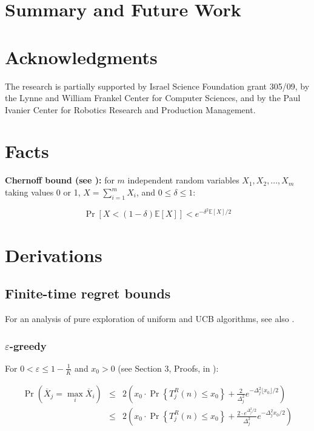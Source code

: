 \documentclass{article}
\newcommand {\IE} {\ensuremath {\mathbb{E}}}
\begin{document}
\section{Summary and Future Work}

\section*{Acknowledgments}

The research is partially supported by Israel
Science Foundation grant 305/09, by the Lynne and William Frankel
Center for Computer Sciences, and by the Paul Ivanier Center for
Robotics Research and Production Management.




\pagebreak

\appendix

\section{Facts}

{\bf Chernoff bound (see \cite{Hagerup.chernoff}):} for $m$ independent random variables $X_1, X_2, ..., X_m$
taking values 0 or 1, $X=\sum_{i=1}^m X_i$, and $0\le\delta\le 1$:

\begin{equation}
\label{eq:chernoff-bound}
\Pr[X < (1-\delta)\IE[X]] < e^{-\delta^2\IE[X]/2}
\end{equation}

\section{Derivations}

\subsection{Finite-time regret bounds}

For an analysis of pure exploration of uniform and UCB algorithms, see also
\cite{Bubeck.pure}.


\subsubsection{$\varepsilon$-greedy}

For $0<\varepsilon\le1-\frac 1 K$ and $x_0>0$ (see Section 3, Proofs, in \cite{Auer.ucb}):

\begin{eqnarray}
\Pr(\overline X_j=\max_i\overline X_i)&\le&2\left(x_0\cdot \Pr\left\{T_j^R(n)\le x_0\right\} + \frac 2{\Delta_j^2}e^{-\Delta_j^2\lfloor x_0 \rfloor/2}\right)\nonumber\\
&\le&2\left(x_0\cdot \Pr\left\{T_j^R(n)\le x_0\right\} + \frac {2 \cdot
  e^{\Delta_j^2/2}}{\Delta_j^2}e^{-\Delta_j^2 x_0 /2}\right)
\end{eqnarray}
\end{document}
